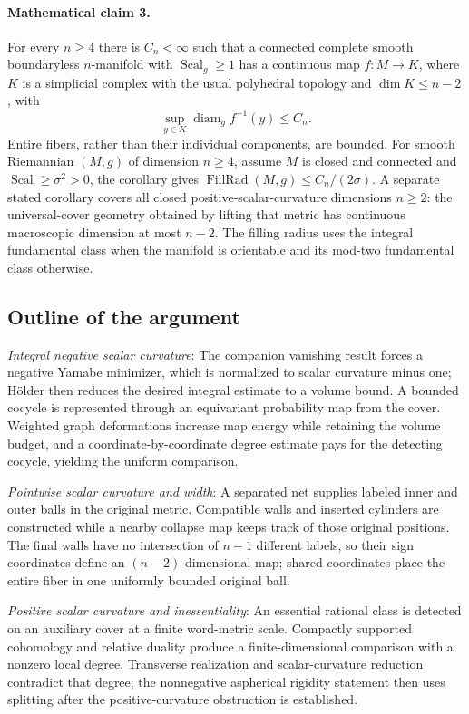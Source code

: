 \documentclass[11pt]{article}
\begin{document}
\paragraph{Mathematical claim 3.} For every $n\ge4$ there is $C_n<\infty$ such that a connected complete smooth boundaryless $n$-manifold with $\operatorname{Scal}_g\ge1$ has a continuous map $f:M\to K$, where $K$ is a simplicial complex with the usual polyhedral topology and $\dim K\le n-2$, with \[\sup_{y\in K}\operatorname{diam}_g f^{-1}(y)\le C_n.\] Entire fibers, rather than their individual components, are bounded. For smooth Riemannian $(M,g)$ of dimension $n\ge4$, assume $M$ is closed and connected and $\operatorname{Scal}\ge\sigma^2>0$, the corollary gives $\operatorname{FillRad}(M,g)\le C_n/(2\sigma)$. A separate stated corollary covers all closed positive-scalar-curvature dimensions $n\ge2$: the universal-cover geometry obtained by lifting that metric has continuous macroscopic dimension at most $n-2$. The filling radius uses the integral fundamental class when the manifold is orientable and its mod-two fundamental class otherwise.

\subsection{Outline of the argument}
\textit{Integral negative scalar curvature}: The companion vanishing result forces a negative Yamabe minimizer, which is normalized to scalar curvature minus one; Hölder then reduces the desired integral estimate to a volume bound. A bounded cocycle is represented through an equivariant probability map from the cover. Weighted graph deformations increase map energy while retaining the volume budget, and a coordinate-by-coordinate degree estimate pays for the detecting cocycle, yielding the uniform comparison.

\textit{Pointwise scalar curvature and width}: A separated net supplies labeled inner and outer balls in the original metric. Compatible walls and inserted cylinders are constructed while a nearby collapse map keeps track of those original positions. The final walls have no intersection of $n-1$ different labels, so their sign coordinates define an $(n-2)$-dimensional map; shared coordinates place the entire fiber in one uniformly bounded original ball.

\textit{Positive scalar curvature and inessentiality}: An essential rational class is detected on an auxiliary cover at a finite word-metric scale. Compactly supported cohomology and relative duality produce a finite-dimensional comparison with a nonzero local degree. Transverse realization and scalar-curvature reduction contradict that degree; the nonnegative aspherical rigidity statement then uses splitting after the positive-curvature obstruction is established.
\end{document}
